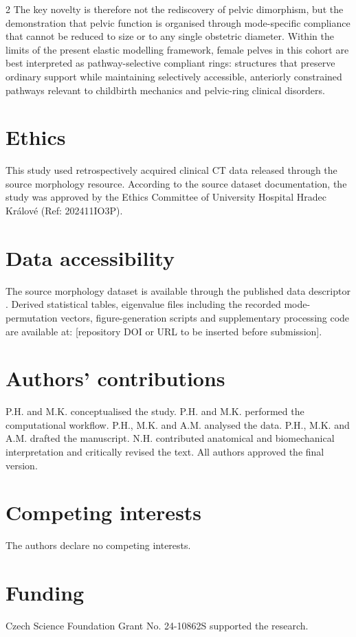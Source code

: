 \documentclass[openacc]{rsproca_new}
\begin{document}
\begin{multicols}{2}
The key novelty is therefore not the rediscovery of pelvic dimorphism, but the demonstration that pelvic function is organised through mode-specific compliance that cannot be reduced to size or to any single obstetric diameter. Within the limits of the present elastic modelling framework, female pelves in this cohort are best interpreted as pathway-selective compliant rings: structures that preserve ordinary support while maintaining selectively accessible, anteriorly constrained pathways relevant to childbirth mechanics and pelvic-ring clinical disorders.

\section*{Ethics}

This study used retrospectively acquired clinical CT data released through the source morphology resource. According to the source dataset documentation, the study was approved by the Ethics Committee of University Hospital Hradec Kr\'{a}lov\'{e} (Ref: 202411IO3P).

\section*{Data accessibility}

The source morphology dataset is available through the published data descriptor \cite{HenysKuchar2025}. Derived statistical tables, eigenvalue files including the recorded mode-permutation vectors, figure-generation scripts and supplementary processing code are available at: [repository DOI or URL to be inserted before submission].

\section*{Authors' contributions}

P.H. and M.K. conceptualised the study. P.H. and M.K. performed the computational workflow. P.H., M.K. and A.M. analysed the data. P.H., M.K. and A.M. drafted the manuscript. N.H. contributed anatomical and biomechanical interpretation and critically revised the text. All authors approved the final version.

\section*{Competing interests}

The authors declare no competing interests.

\section*{Funding}
Czech Science Foundation Grant No. 24-10862S supported the research.
\end{multicols}
\end{document}
